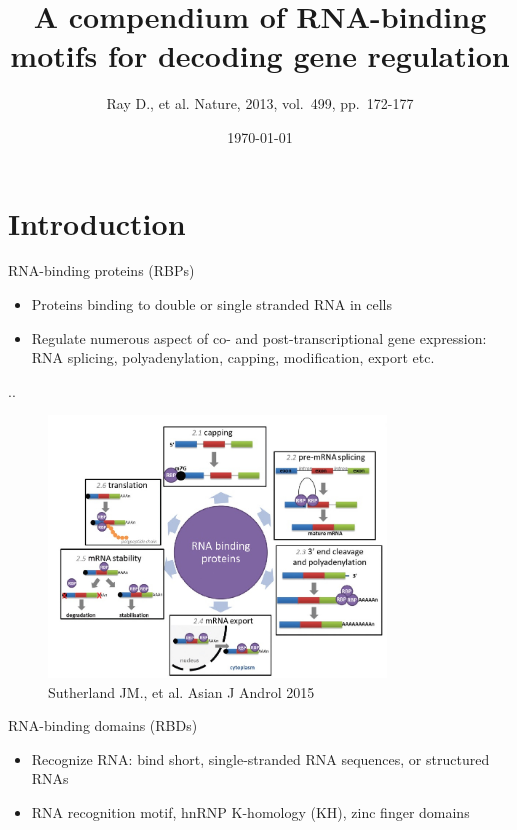 \documentclass[professionalfont, 12pt, default]{beamer}
\title{A compendium of RNA-binding motifs for decoding gene regulation}
\author{Ray D., et al. Nature, 2013, vol.~499, pp.~172-177}
\date{\today}
\providecommand{\tightlist}{%
    \setlength{\itemsep}{0pt}\setlength{\parskip}{0pt}}
\begin{document}
\frame{\titlepage}

\section{Introduction}\label{introduction}

\begin{frame}{RNA-binding proteins (RBPs)}

\begin{itemize}
\tightlist
\item
  Proteins binding to double or single stranded RNA in cells
\item
  Regulate numerous aspect of co- and post-transcriptional gene
  expression: RNA splicing, polyadenylation, capping, modification,
  export etc.
\end{itemize}

\end{frame}

\begin{frame}{..}

\begin{figure}
\centering
\includegraphics[width=0.80000\textwidth]{img/RBPs1.jpg}
\caption{Sutherland JM., et al. Asian J Androl 2015}
\end{figure}

\end{frame}

\begin{frame}{RNA-binding domains (RBDs)}

\begin{itemize}
\tightlist
\item
  Recognize RNA: bind short, single-stranded RNA sequences, or
  structured RNAs
\item
  RNA recognition motif, hnRNP K-homology (KH), zinc finger domains
\end{itemize}

\end{frame}
\end{document}
